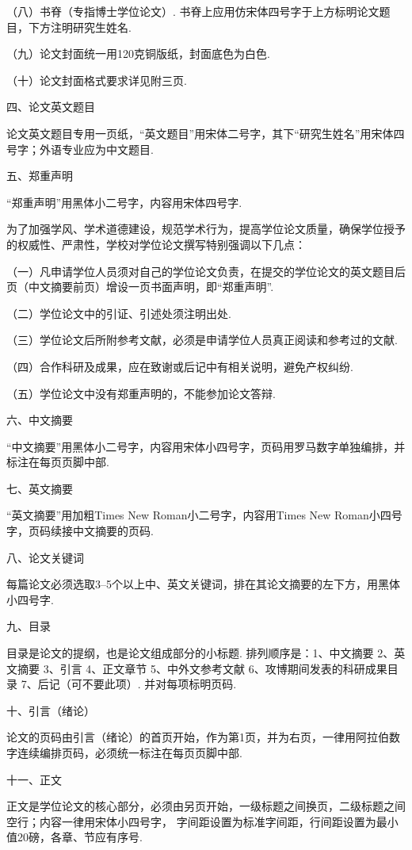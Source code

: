 \documentclass{WHUPhd}  %
\begin{document}
（八）书脊（专指博士学位论文）. 书脊上应用仿宋体四号字于上方标明论文题目，下方注明研究生姓名.

（九）论文封面统一用120克铜版纸，封面底色为白色.

（十）论文封面格式要求详见附三页.

{\heiti 四、论文英文题目}

论文英文题目专用一页纸，``英文题目''用宋体二号字，其下``研究生姓名''用宋体四号字；外语专业应为中文题目.

{\heiti 五、郑重声明}


``郑重声明''用黑体小二号字，内容用宋体四号字.

为了加强学风、学术道德建设，规范学术行为，提高学位论文质量，确保学位授予的权威性、严肃性，学校对学位论文撰写特别强调以下几点：

（一）凡申请学位人员须对自己的学位论文负责，在提交的学位论文的英文题目后页（中文摘要前页）增设一页书面声明，即``郑重声明''.

（二）学位论文中的引证、引述处须注明出处.

（三）学位论文后所附参考文献，必须是申请学位人员真正阅读和参考过的文献.

（四）合作科研及成果，应在致谢或后记中有相关说明，避免产权纠纷.

（五）学位论文中没有郑重声明的，不能参加论文答辩.

{\heiti 六、中文摘要}

``中文摘要''用黑体小二号字，内容用宋体小四号字，页码用罗马数字单独编排，并标注在每页页脚中部.

{\heiti 七、英文摘要}

``英文摘要''用加粗Times New Roman小二号字，内容用Times New Roman小四号字，页码续接中文摘要的页码.

{\heiti 八、论文关键词}

每篇论文必须选取3--5个以上中、英文关键词，排在其论文摘要的左下方，用黑体小四号字.

{\heiti 九、目录}

目录是论文的提纲，也是论文组成部分的小标题.
排列顺序是：1、中文摘要 2、英文摘要 3、引言 4、正文章节 5、中外文参考文献 6、攻博期间发表的科研成果目录
7、后记（可不要此项）. 并对每项标明页码.

{\heiti 十、引言（绪论）}

论文的页码由引言（绪论）的首页开始，作为第1页，并为右页，一律用阿拉伯数字连续编排页码，必须统一标注在每页页脚中部.

{\heiti 十一、正文}

正文是学位论文的核心部分，必须由另页开始，一级标题之间换页，二级标题之间空行；内容一律用宋体小四号字，
字间距设置为标准字间距，行间距设置为最小值20磅，各章、节应有序号.
\end{document}
